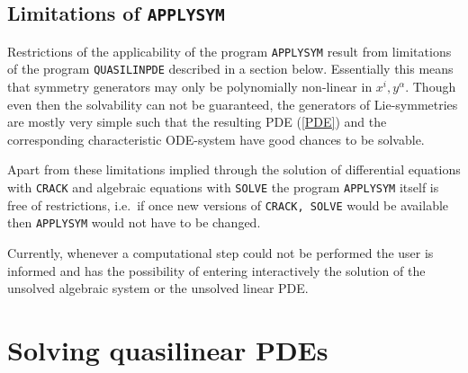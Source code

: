 \documentclass[12pt]{article}
\begin{document}
\subsection{Limitations of {\tt APPLYSYM}}
Restrictions of the applicability of the program {\tt APPLYSYM} result
from limitations of the program {\tt QUASILINPDE} described in a section below.
Essentially this means that symmetry generators may only be polynomially
non-linear in $x^i, y^\alpha$.
Though even then the solvability can not be guaranteed, the
generators of Lie-symmetries are mostly very simple such that the
resulting PDE (\ref{PDE}) and the corresponding characteristic 
ODE-system have good chances to be solvable.

Apart from these limitations implied through the solution of differential
equations with {\tt CRACK} and algebraic equations with {\tt SOLVE}
the program {\tt APPLYSYM} itself is free of restrictions,
i.e.\ if once new versions of {\tt CRACK, SOLVE}
would be available then {\tt APPLYSYM} would not have to be changed.

Currently, whenever a computational step could not be performed
the user is informed and has the possibility of entering interactively
the solution of the unsolved algebraic system or the unsolved linear PDE.
\section{Solving quasilinear PDEs}
\end{document}
